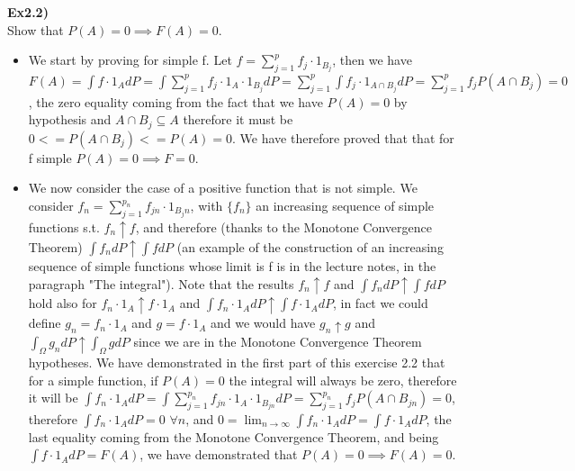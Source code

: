\documentclass[12pt,mythesisstyle]{report}
\begin{document}
\textbf{Ex2.2)}\\
Show that $P(A)=0\implies F(A)=0$.
\begin{itemize}
\item We start by proving for simple f. Let $f=\sum_{j=1}^p f_j\cdot 1_{B_j}$, then we have $F(A)=\int f\cdot 1_{A}dP=\int \sum_{j=1}^p f_j\cdot 1_A\cdot 1_{B_j}dP=\sum_{j=1}^p \int f_j\cdot 1_{A\cap B_j}dP=\sum_{j=1}^p f_jP(A\cap B_j)=0$, the zero equality coming from the fact that we have $P(A)=0$ by hypothesis and $A\cap B_j\subseteq A$ therefore it must be $0<=P(A\cap B_j)<=P(A)=0$. We have therefore proved that that for f simple $P(A)=0\implies F=0$.
\item We now consider the case of a positive function that is not simple. We consider $f_n=\sum_{j=1}^{p_n} f_{jn}\cdot 1_{B_jn}$, with $\{f_n\}$ an increasing sequence of simple functions s.t. $f_n\uparrow f$, and therefore (thanks to the Monotone Convergence Theorem) $\int f_ndP\uparrow\int fdP$ (an example of the construction of an increasing sequence of simple functions whose limit is f is in the lecture notes, in the paragraph "The integral"). Note that the results $f_n\uparrow f$ and $\int f_ndP\uparrow\int fdP$ hold also for $f_n\cdot 1_A\uparrow f\cdot 1_A$ and $\int f_n\cdot 1_A dP\uparrow\int f\cdot 1_A dP$, in fact we could define $g_n=f_n\cdot 1_A$ and $g=f\cdot 1_A$ and we would have $g_n\uparrow g$ and $\int_{\Omega} g_ndP\uparrow\int_{\Omega} gdP$ since we are in the Monotone Convergence Theorem hypotheses. We have demonstrated in the first part of this exercise 2.2 that for a simple function, if $P(A)=0$ the integral will always be zero, therefore it will be $\int f_n\cdot 1_{A}dP=\int \sum_{j=1}^{p_n} f_{jn}\cdot 1_A\cdot 1_{B_{jn}}dP=\sum_{j=1}^{p_n} f_jP(A\cap B_{jn})=0$, therefore $\int f_n\cdot 1_{A}dP=0$ $\forall n$, and $0=\lim_{n \to \infty}\int f_n\cdot 1_{A}dP=\int f\cdot 1_{A}dP$, the last equality coming from the Monotone Convergence Theorem, and being $\int f\cdot 1_{A}dP=F(A)$, we have demonstrated that $P(A)=0\implies F(A)=0$.
\end{itemize}
\end{document}
